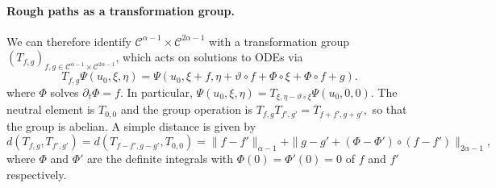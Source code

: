 \documentclass[11pt,a4paper]{article}
\theoremstyle{remark}
\newcommand{\CC}{\ensuremath{\mathscr{C}}}
\begin{document}
\paragraph{Rough paths as a transformation group.}

We can therefore identify $\CC^{\alpha -1} \times \CC^{2 \alpha -1}$
with a transformation group $( T_{f,g} )_{f,g \in \CC^{\alpha -1}\times \CC^{2 \alpha -1}}$, which acts on solutions to ODEs via
\[
   T_{f,g} \Psi ( u_{0} , \xi , \eta ) = \Psi ( u_{0} , \xi +f, \eta + \vartheta \circ f+\Phi \circ   \xi +\Phi \circ  f+g ).
\]
where $\Phi$ solves $\partial_t \Phi = f$.
In particular,
$
   \Psi ( u_{0} , \xi , \eta ) =T_{\xi , \eta - \vartheta \circ   \xi} \Psi ( u_{0} ,0,0 ).
$
The neutral element is $T_{0,0}$ and the group operation is
$
   T_{f,g} T_{f' ,g'} =T_{f+f' ,g+g'} ,
$ so that the group is abelian. A simple distance is given by
\[
   d ( T_{f,g} ,T_{f' ,g'} ) =d ( T_{f-f' ,g-g'} ,T_{0,0} ) = \| f-f' \|_{\alpha -1} + \| g-g' + ( \Phi - \Phi' ) \circ ( f-f' ) \|_{2 \alpha -1},
\]
where $\Phi$ and $\Phi'$ are the definite integrals with $\Phi ( 0 ) = \Phi' (0 ) =0$ of $f$ and $f'$ respectively.
\end{document}

